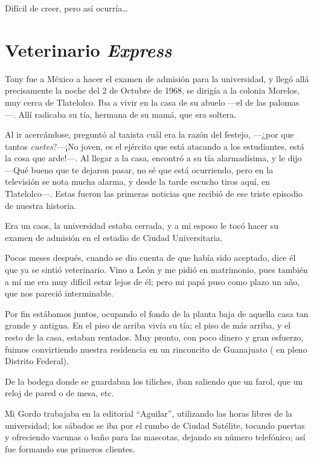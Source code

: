 \documentclass[letterpaper, 12pt]{book}
\begin{document}
Difícil de creer, pero así ocurría\ldots
\chapter{Veterinario {\it Express} }
Tony fue a México a hacer el examen de admisión para la universidad, y llegó allá precisamente la noche del 2 de Octubre de 1968, se dirigía a la colonia Morelos, muy cerca de Tlatelolco. Iba a vivir en la casa de su abuelo ---el de las palomas---. Allí radicaba su tía, hermana de su mamá, que era soltera. 

Al ir acercándose, preguntó al taxista cuál era la razón del festejo, ---¿por que tantos {\it cuetes}?---¡No joven, es el ejército que está atacando a los estudiantes, está la cosa que arde!---.
Al llegar a la casa, encontró a su tía alarmadísima, y le dijo ---Qué bueno que te dejaron pasar, no sé que está ocurriendo, pero en la televisión se nota mucha alarma, y desde la tarde escucho tiros aquí, en Tlatelolco---. Estas fueron las primeras noticias que recibió de ese triste episodio de nuestra historia. 

Era un caos, la universidad estaba cerrada, y a mi esposo le tocó hacer su examen de admisión en el estadio de Ciudad Universitaria. 

Pocos meses después, cuando se dio cuenta de que había sido aceptado, dice él que ya se sintió veterinario. Vino a León y me pidió en matrimonio, pues también a mí me era muy difícil estar lejos de él; pero mi papá puso como plazo un año, que nos pareció interminable.

Por fin estábamos juntos, ocupando el fondo de la planta baja de aquella casa tan grande y antigua. En el piso de arriba vivía su tía; el piso de más arriba, y el resto de la casa, estaban rentados. Muy pronto, con poco dinero y gran esfuerzo, fuimos convirtiendo nuestra residencia en un rinconcito de Guanajuato ( en pleno Distrito Federal).

De la bodega donde se guardaban los tiliches, iban saliendo que un farol, que un reloj de pared o de mesa, etc.

Mi Gordo trabajaba en la editorial ``Aguilar'', utilizando las horas libres de la universidad; los sábados se iba por el rumbo de Ciudad Satélite, tocando puertas y ofreciendo vacunas o baño para las mascotas, dejando su número telefónico; así fue formando sus primeros clientes.
\end{document}
